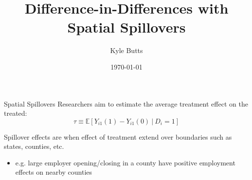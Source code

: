 \documentclass[aspectratio=169]{beamer}
\title{Difference-in-Differences with Spatial Spillovers}
\date{\today}
\author{Kyle Butts}
\begin{document}
\maketitle

\begin{frame}{Spatial Spillovers}
    Researchers aim to estimate the average treatment effect on the treated: 
    \[
        \tau \equiv \mathbb{E} \left[ Y_{i1}(1) - Y_{i1}(0) \ \vert \ D_{i} = 1 \right]
    \]
    
    \vspace{5mm}
    Spillover effects are when effect of treatment extend over boundaries such as states, counties, etc.
    
    \begin{itemize}
        \item e.g. large employer opening/closing in a county have positive employment effects on nearby counties
    \end{itemize}
\end{frame}
\end{document}
